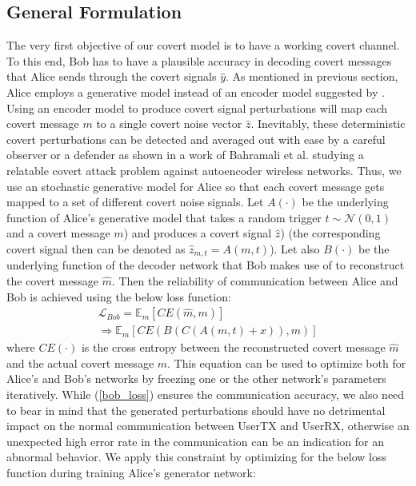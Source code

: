 \subsection{General Formulation}
The very first objective of our covert model is to have a working covert channel. To this end, Bob has to have a plausible accuracy in decoding covert messages that Alice sends through the covert signals \(\hat{y}\). As mentioned in previous section, Alice employs a generative model instead of an encoder model suggested by \cite{mohammed2021adversarial}. Using an encoder model to produce covert signal perturbations will map each covert message \(m\) to a single covert noise vector \(\hat{z}\). Inevitably, these deterministic covert perturbations can be detected and averaged out with ease by a careful observer or a defender as shown in a work of Bahramali et al. \cite{bahramali2021robust} studying a relatable covert attack problem against autoencoder wireless networks. Thus, we use an stochastic generative model for Alice so that each covert message gets mapped to a set of different covert noise signals. Let \(A(\cdot)\) be the underlying function of Alice's generative model that takes a random trigger \(t \sim \mathcal{N}(0, 1)\) and a covert message \(m\)) and produces a covert signal \(\hat{z}\)) (the corresponding covert signal then can be denoted as \(\hat{z}_{m, t} = A(m, t)\)). Let also  \(B(\cdot)\) be the underlying function of the decoder network that Bob makes use of to reconstruct the covert message \(\hat{m}\). Then the reliability of communication between Alice and Bob is achieved using the below loss function:
\begin{equation}
	\begin{array}{l} \label{bob_loss}
	\mathcal{L}_{Bob} = \mathbb{E}_{m}[CE(\hat{m}, m)] \\ \Rightarrow \mathbb{E}_{m}[CE(B(C(A(m, t) + x)), m)]
	\end{array}
\end{equation}
where \(CE(\cdot)\) is the cross entropy between the reconstructed covert message \(\hat{m}\) and the actual covert message \(m\). This equation can be used to optimize both for Alice's and Bob's networks by freezing one or the other network's parameters iteratively. While (\ref{bob_loss}) ensures the communication accuracy, we also need to bear in mind that the generated perturbations should have no detrimental impact on the normal communication between UserTX and UserRX, otherwise an unexpected high error rate in the communication can be an indication for an abnormal behavior. We apply this constraint by optimizing for the below loss function during training Alice's generator network:
